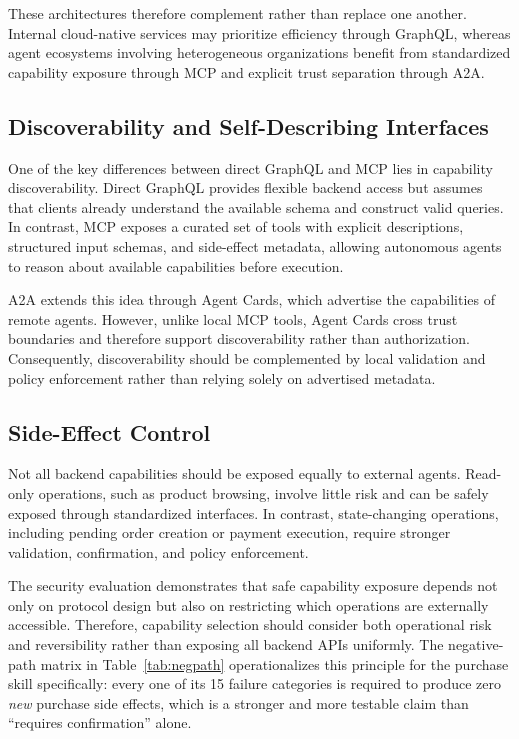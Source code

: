 \documentclass[conference]{IEEEtran}
\begin{document}
These architectures therefore complement rather than replace one another.
Internal cloud-native services may prioritize efficiency through GraphQL,
whereas agent ecosystems involving heterogeneous organizations benefit from
standardized capability exposure through MCP and explicit trust separation
through A2A.

\subsection{Discoverability and Self-Describing Interfaces}

One of the key differences between direct GraphQL and MCP lies in capability
discoverability. Direct GraphQL provides flexible backend access but assumes
that clients already understand the available schema and construct valid
queries. In contrast, MCP exposes a curated set of tools with explicit
descriptions, structured input schemas, and side-effect metadata, allowing
autonomous agents to reason about available capabilities before execution.

A2A extends this idea through Agent Cards, which advertise the capabilities
of remote agents. However, unlike local MCP tools, Agent Cards cross trust
boundaries and therefore support discoverability rather than authorization.
Consequently, discoverability should be complemented by local validation and
policy enforcement rather than relying solely on advertised metadata.

\subsection{Side-Effect Control}

Not all backend capabilities should be exposed equally to external agents.
Read-only operations, such as product browsing, involve little risk and can
be safely exposed through standardized interfaces. In contrast,
state-changing operations, including pending order creation or payment
execution, require stronger validation, confirmation, and policy
enforcement.

The security evaluation demonstrates that safe capability exposure depends
not only on protocol design but also on restricting which operations are
externally accessible. Therefore, capability selection should consider both
operational risk and reversibility rather than exposing all backend APIs
uniformly. The negative-path matrix in Table~\ref{tab:negpath} operationalizes
this principle for the purchase skill specifically: every one of its 15
failure categories is required to produce zero \emph{new} purchase side
effects, which is a stronger and more testable claim than ``requires
confirmation'' alone.
\end{document}
